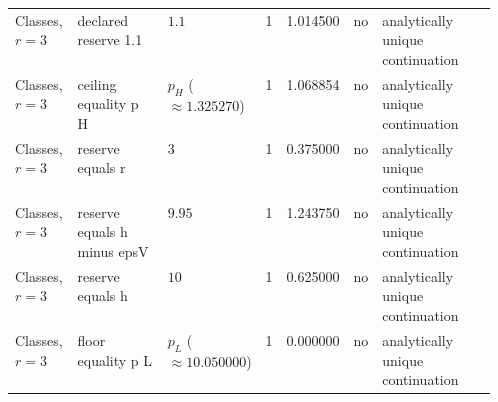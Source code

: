 \begin{landscape}
\begin{longtable}{@{}p{0.13\linewidth}p{0.19\linewidth}lrrlp{0.24\linewidth}@{}}
Classes, $r=3$ & declared reserve 1.1 & $1.1$ & 1 & 1.014500 & no & analytically unique continuation \\
Classes, $r=3$ & ceiling equality p H & $p_H$ ($\approx 1.325270$) & 1 & 1.068854 & no & analytically unique continuation \\
Classes, $r=3$ & reserve equals r & $3$ & 1 & 0.375000 & no & analytically unique continuation \\
Classes, $r=3$ & reserve equals h minus epsV & $9.95$ & 1 & 1.243750 & no & analytically unique continuation \\
Classes, $r=3$ & reserve equals h & $10$ & 1 & 0.625000 & no & analytically unique continuation \\
Classes, $r=3$ & floor equality p L & $p_L$ ($\approx 10.050000$) & 1 & 0.000000 & no & analytically unique continuation \\
\end{longtable}\endgroup\end{landscape}

